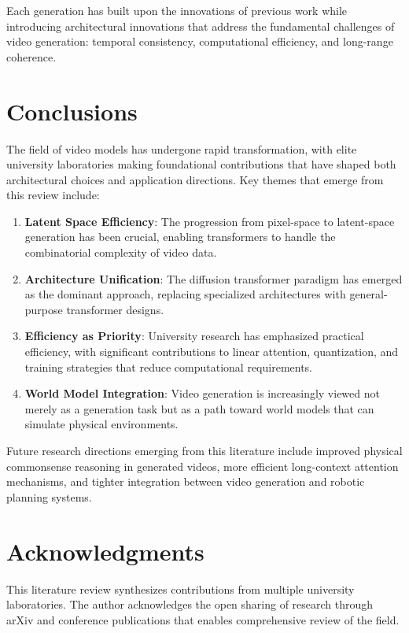 Each generation has built upon the innovations of previous work while introducing architectural innovations that address the fundamental challenges of video generation: temporal consistency, computational efficiency, and long-range coherence.

\section{Conclusions}

The field of video models has undergone rapid transformation, with elite university laboratories making foundational contributions that have shaped both architectural choices and application directions. Key themes that emerge from this review include:

\begin{enumerate}
    \item \textbf{Latent Space Efficiency}: The progression from pixel-space to latent-space generation has been crucial, enabling transformers to handle the combinatorial complexity of video data.
    \item \textbf{Architecture Unification}: The diffusion transformer paradigm has emerged as the dominant approach, replacing specialized architectures with general-purpose transformer designs.
    \item \textbf{Efficiency as Priority}: University research has emphasized practical efficiency, with significant contributions to linear attention, quantization, and training strategies that reduce computational requirements.
    \item \textbf{World Model Integration}: Video generation is increasingly viewed not merely as a generation task but as a path toward world models that can simulate physical environments.
\end{enumerate}

Future research directions emerging from this literature include improved physical commonsense reasoning in generated videos, more efficient long-context attention mechanisms, and tighter integration between video generation and robotic planning systems.

\section{Acknowledgments}

This literature review synthesizes contributions from multiple university laboratories. The author acknowledges the open sharing of research through arXiv and conference publications that enables comprehensive review of the field.